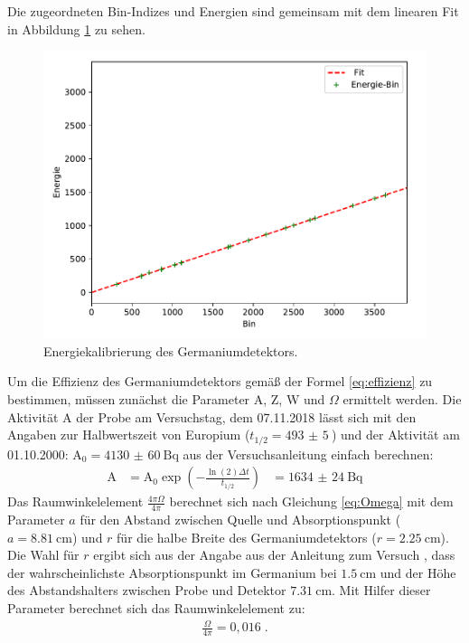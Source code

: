 \noindent Die zugeordneten Bin-Indizes und Energien sind gemeinsam mit dem linearen Fit in Abbildung \ref{abb:linfit} zu sehen.
\FloatBarrier
\begin{figure}
    \centering
    \includegraphics[scale=0.7]{Kalibrierung.pdf}
    \caption{Energiekalibrierung des Germaniumdetektors.}
    \label{abb:linfit}
\end{figure}
\FloatBarrier

\noindent Um die Effizienz des Germaniumdetektors gemäß der Formel \ref{eq:effizienz} zu bestimmen, müssen zunächst die Parameter A, Z, W und $\Omega$ ermittelt werden.
Die Aktivität A der Probe am Versuchstag, dem 07.11.2018 lässt sich mit den Angaben zur Halbwertszeit von Europium ($t_{1/2}=\SI{493(5)}{}$) und der Aktivität am 01.10.2000: $\text{A}_0= \SI{4130(60)}{\becquerel}$ aus der Versuchsanleitung \cite{Q1} einfach berechnen:
\begin{align*}
    \text{A} &= \text{A}_0 \exp \left(-\frac{\ln(2) \Delta t}{t_{1/2}}\right)
    &= \SI{1634(24)}{\becquerel}
\end{align*}
Das Raumwinkelelement $\frac{4 \pi\Omega}{4 \pi}$ berechnet sich nach Gleichung \ref{eq:Omega} mit dem Parameter $a$ für den Abstand zwischen Quelle und Absorptionspunkt ($a=\SI{8,81}{\centi\meter}$) und $r$ für die halbe Breite des Germaniumdetektors ($r= \SI{2,25}{\centi \meter}$). Die Wahl für $r$ ergibt sich aus der Angabe aus der Anleitung zum Versuch \cite{Q1}, dass der wahrscheinlichste Absorptionspunkt im Germanium bei $\SI{1,5}{\centi \meter}$ und der Höhe des Abstandshalters zwischen Probe und Detektor $\SI{7,31}{\centi \meter}$.
Mit Hilfer dieser Parameter berechnet sich das Raumwinkelelement zu:
\begin{align*}
    \frac{\Omega}{4 \pi} = 0,016 \; .
\end{align*}

